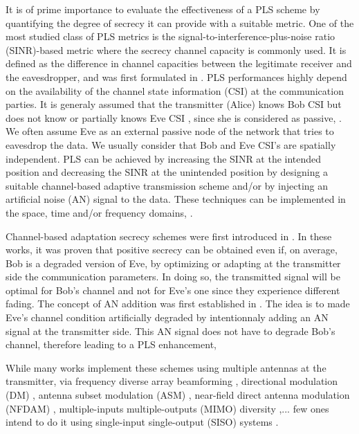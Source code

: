 \documentclass[journal,comsoc]{IEEEtran}
\begin{document}
It is of prime importance to evaluate the effectiveness of a PLS scheme by quantifying the degree of secrecy it can provide with a suitable metric. One of the most studied class of PLS metrics is the signal-to-interference-plus-noise ratio (SINR)-based metric where the secrecy channel capacity is commonly used. It is defined as the difference in channel capacities between the legitimate receiver and the eavesdropper, and was first formulated in \cite{6772207}.  PLS performances highly depend on the availability of the channel state information (CSI) at the communication parties. It is generaly assumed that the transmitter (Alice) knows Bob CSI but does not know or partially knows Eve CSI , since she is considered as passive, \cite{8509094}. We often assume Eve as an external passive node of the network that tries to eavesdrop the data. We usually consider that Bob and Eve CSI's are spatially independent. PLS can be achieved by increasing the SINR at the intended position and decreasing the SINR at the unintended position by designing a suitable channel-based adaptive transmission scheme and/or by injecting an artificial noise (AN) signal to the data. These techniques can be implemented in the space, time and/or frequency domains, \cite{8509094,7762075,MELKI20191}.

Channel-based adaptation secrecy schemes were first introduced in \cite{4529264,4529282,4626059}. In these works, it was proven that positive secrecy can be obtained even if, on average, Bob is a degraded version of Eve, by optimizing or adapting at the transmitter side the communication parameters. In doing so, the transmitted signal will be optimal for Bob's channel and not for Eve's one since they experience different fading. The concept of AN addition was first established in \cite{1558439,1605889,4543070}. The idea is to made Eve's channel condition artificially degraded by intentionnaly adding an AN signal at the transmitter side. This AN signal does not have to degrade Bob's channel, therefore leading to a PLS enhancement, \cite{8509094}


While many works implement these schemes using multiple antennas at the transmitter, via frequency diverse array beamforming \cite{li_qiang_2018_1159254,8078202}, directional modulation (DM) \cite{5159486},  antenna subset modulation (ASM) \cite{6544472}, near-field direct antenna modulation (NFDAM) \cite{4684619,4523120}, multiple-inputs multiple-outputs (MIMO) diversity \cite{5580113,7070667,8786136,5738303},... few ones intend to do it using single-input single-output (SISO) systems \cite{li2013waveform,9003692,8093595,8093591,xu2018security,li2018artificial,li2017artificial,9049811,7475864,7041552}.
\end{document}
